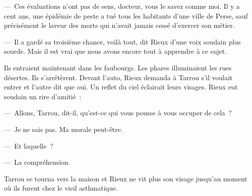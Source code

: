 \documentclass[french,twoside]{book} %
\begin{document}
— Ces évaluations n’ont pas de sens, docteur, vous le savez comme moi. Il y a cent ans, une épidémie de peste a tué tous les habitants d’une ville de Perse, sauf précisément le laveur des morts qui n’avait jamais cessé d’exercer son métier.\par
— Il a gardé sa troisième chance, voilà tout, dit Rieux d’une voix soudain plus sourde. Mais il est vrai que nous avons encore tout à apprendre à ce sujet.\par
Ils entraient maintenant dans les faubourgs. Les phares illuminaient les rues désertes. Ils s’arrêtèrent. Devant l’auto, Rieux demanda à Tarrou s’il voulait entrer et l’autre dit que oui. Un reflet du ciel éclairait leurs visages. Rieux eut soudain un rire d’amitié :\par
— Allons, Tarrou, dit-il, qu’est-ce qui vous pousse à vous occuper de cela ?\par
— Je ne sais pas. Ma morale peut-être.\par
— Et laquelle ?\par
— La compréhension.\par
Tarrou se tourna vers la maison et Rieux ne vit plus son visage jusqu’au moment où ils furent chez le vieil asthmatique.
\end{document}
